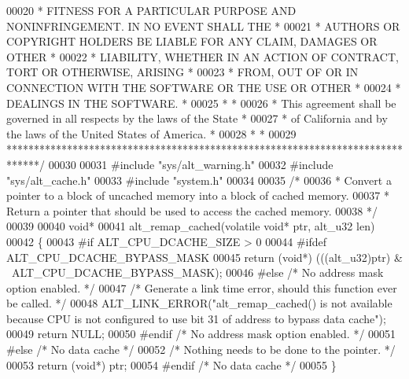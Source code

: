 \begin{DoxyCode}
00020 \textcolor{comment}{* FITNESS FOR A PARTICULAR PURPOSE AND NONINFRINGEMENT. IN NO EVENT SHALL THE *}
00021 \textcolor{comment}{* AUTHORS OR COPYRIGHT HOLDERS BE LIABLE FOR ANY CLAIM, DAMAGES OR OTHER      *}
00022 \textcolor{comment}{* LIABILITY, WHETHER IN AN ACTION OF CONTRACT, TORT OR OTHERWISE, ARISING     *}
00023 \textcolor{comment}{* FROM, OUT OF OR IN CONNECTION WITH THE SOFTWARE OR THE USE OR OTHER         *}
00024 \textcolor{comment}{* DEALINGS IN THE SOFTWARE.                                                   *}
00025 \textcolor{comment}{*                                                                             *}
00026 \textcolor{comment}{* This agreement shall be governed in all respects by the laws of the State   *}
00027 \textcolor{comment}{* of California and by the laws of the United States of America.              *}
00028 \textcolor{comment}{*                                                                             *}
00029 \textcolor{comment}{******************************************************************************/}
00030 
00031 \textcolor{preprocessor}{#include "sys/alt_warning.h"}
00032 \textcolor{preprocessor}{#include "sys/alt_cache.h"}
00033 \textcolor{preprocessor}{#include "system.h"}
00034 
00035 \textcolor{comment}{/*}
00036 \textcolor{comment}{ * Convert a pointer to a block of uncached memory into a block of cached memory.}
00037 \textcolor{comment}{ * Return a pointer that should be used to access the cached memory.}
00038 \textcolor{comment}{ */}
00039 
00040 \textcolor{keywordtype}{void}* 
00041 alt_remap_cached(\textcolor{keyword}{volatile} \textcolor{keywordtype}{void}* ptr, alt_u32 len)
00042 \{
00043 \textcolor{preprocessor}{#if ALT\_CPU\_DCACHE\_SIZE > 0}
00044 \textcolor{preprocessor}{#ifdef ALT\_CPU\_DCACHE\_BYPASS\_MASK}
00045   \textcolor{keywordflow}{return} (\textcolor{keywordtype}{void}*) (((alt_u32)ptr) & ~ALT\_CPU\_DCACHE\_BYPASS\_MASK);
00046 \textcolor{preprocessor}{#else }\textcolor{comment}{/* No address mask option enabled. */}\textcolor{preprocessor}{}
00047   \textcolor{comment}{/* Generate a link time error, should this function ever be called. */}
00048   ALT_LINK_ERROR(\textcolor{stringliteral}{"alt\_remap\_cached() is not available because CPU is not configured to use bit 31 of
       address to bypass data cache"});
00049   \textcolor{keywordflow}{return} NULL;
00050 \textcolor{preprocessor}{#endif }\textcolor{comment}{/* No address mask option enabled. */}\textcolor{preprocessor}{}
00051 \textcolor{preprocessor}{#else }\textcolor{comment}{/* No data cache */}\textcolor{preprocessor}{}
00052   \textcolor{comment}{/* Nothing needs to be done to the pointer. */}
00053   \textcolor{keywordflow}{return} (\textcolor{keywordtype}{void}*) ptr;
00054 \textcolor{preprocessor}{#endif }\textcolor{comment}{/* No data cache */}\textcolor{preprocessor}{}
00055 \}
\end{DoxyCode}
